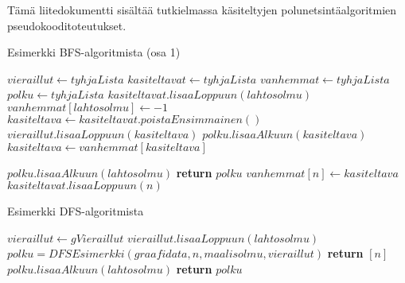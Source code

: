 Tämä liitedokumentti sisältää tutkielmassa käsiteltyjen 
polunetsintäalgoritmien pseudokooditoteutukset.

\begin{algorithm}
\caption{Esimerkki BFS-algoritmista (osa 1)}\label{BFSEsim}
\begin{algoritmic}
	\State $vieraillut \gets tyhjaLista$
	\State $kasiteltavat \gets tyhjaLista$
	\State $vanhemmat \gets tyhjaLista$
	\State $polku \gets tyhjaLista$
	\State $kasiteltavat.lisaaLoppuun(lahtosolmu)$
	\State $vanhemmat[lahtosolmu] \gets -1$
		\State $kasiteltava \gets kasiteltavat.poistaEnsimmainen()$
		\State $vieraillut.lisaaLoppuun(kasiteltava)$
				\State $polku.lisaaAlkuun(kasiteltava)$
				\State $kasiteltava \gets vanhemmat[kasiteltava]$
			\EndWhile


			\State $polku.lisaaAlkuun(lahtosolmu)$
			\State \textbf{return} $polku$
		\Else
					\State $vanhemmat[n] \gets kasiteltava$
					\State $kasiteltavat.lisaaLoppuun(n)$
				\EndIf
			\EndFor
		\EndIf
	\EndWhile
\EndProcedure
\end{algoritmic}
\end{algorithm}

\begin{algorithm}
\caption{Esimerkki DFS-algoritmista}\label{DFSEsim}
\begin{algorithmic}
	\State $vieraillut \gets gVieraillut$
	\State $vieraillut.lisaaLoppuun(lahtosolmu)$
				\State $polku = DFSEsimerkki(graafidata,n,maalisolmu,vieraillut)$
			\Else
				\State \textbf{return} $[n]$
			\EndIf
		\EndIf
	\EndFor
		\State $polku.lisaaAlkuun(lahtosolmu)$
	\EndIf
	\State \textbf{return} $polku$
\EndProcedure
\end{algorithmic}
\end{algorithm}

